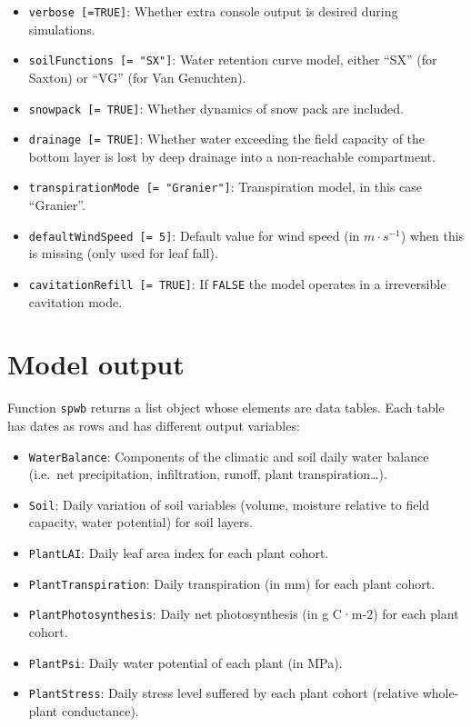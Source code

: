 \documentclass[]{book}
\providecommand{\tightlist}{%
  \setlength{\itemsep}{0pt}\setlength{\parskip}{0pt}}
\begin{document}
\begin{itemize}
\tightlist
\item
  \texttt{verbose\ {[}=TRUE{]}}: Whether extra console output is desired during simulations.
\item
  \texttt{soilFunctions\ {[}=\ "SX"{]}}: Water retention curve model, either ``SX'' (for Saxton) or ``VG'' (for Van Genuchten).
\item
  \texttt{snowpack\ {[}=\ TRUE{]}}: Whether dynamics of snow pack are included.
\item
  \texttt{drainage\ {[}=\ TRUE{]}}: Whether water exceeding the field capacity of the bottom layer is lost by deep drainage into a non-reachable compartment.
\item
  \texttt{transpirationMode\ {[}=\ "Granier"{]}}: Transpiration model, in this case ``Granier''.
\item
  \texttt{defaultWindSpeed\ {[}=\ 5{]}}: Default value for wind speed (in \(m \cdot s^{-1}\)) when this is missing (only used for leaf fall).
\item
  \texttt{cavitationRefill\ {[}=\ TRUE{]}}: If \texttt{FALSE} the model operates in a irreversible cavitation mode.
\end{itemize}

\hypertarget{model-output}{%
\section{Model output}\label{model-output}}

Function \texttt{spwb} returns a list object whose elements are data tables. Each table has dates as rows and has different output variables:

\begin{itemize}
\tightlist
\item
  \texttt{WaterBalance}: Components of the climatic and soil daily water balance (i.e.~net precipitation, infiltration, runoff, plant transpiration\ldots{}).
\item
  \texttt{Soil}: Daily variation of soil variables (volume, moisture relative to field capacity, water potential) for soil layers.
\item
  \texttt{PlantLAI}: Daily leaf area index for each plant cohort.
\item
  \texttt{PlantTranspiration}: Daily transpiration (in mm) for each plant cohort.
\item
  \texttt{PlantPhotosynthesis}: Daily net photosynthesis (in g C·m-2) for each plant cohort.
\item
  \texttt{PlantPsi}: Daily water potential of each plant (in MPa).
\item
  \texttt{PlantStress}: Daily stress level suffered by each plant cohort (relative whole-plant conductance).
\end{itemize}
\end{document}
